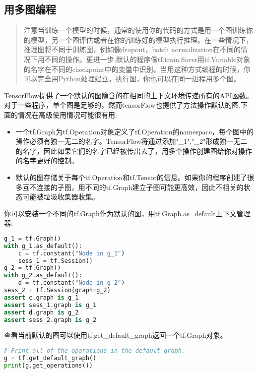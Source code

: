 \subsection{用多图编程}
\begin{quote}
注意当训练一个模型的时候，通常的使用你的代码的方式是用一个图训练你的模型，另一个图评估或者在你的训练好的模型执行推理。在一些情况下，推理图将不同于训练图，例如像dropout，batch normalization在不同的情况下用不同的操作。更进一步,默认的程序像tf.train.Saver用tf.Variable对象的名字在不同的checkpoint中的变量中识别。当用这种方式编程的时候，你可以完全用Python处理建立，执行图，你也可以在同一进程用多个图。
\end{quote}
TensorFlow提供了一个默认的图隐含的在相同的上下文环境传递所有的API函数。对于一些程序，单个图是足够的，然而tensorFlow也提供了方法操作默认的图,下面的情况在高级使用情况可能很有用:
\begin{itemize}
	\item 一个tf.Graph为tf.Operation对象定义了tf.Operation的namespace，每个图中的操作必须有独一无二的名字。TensorFlow将通过添加"\_1","\_2"形成独一无二的名字，因此如果它们的名字已经被传出去了，用多个操作创建图给你对操作的名字更好的控制。
	\item 默认的图存储关于每个tf.Operation和tf.Tensor的信息。如果你的程序创建了很多互不连接的子图，用不同的tf.Graph建立子图可能更高效，因此不相关的状态可能被垃圾收集器收集。
\end{itemize}
你可以安装一个不同的tf.Graph作为默认的图，用tf.Graph.as\_default上下文管理器:
\begin{lstlisting}[language=Python]
g_1 = tf.Graph()
with g_1.as_default():
    c = tf.constant("Node in g_1")
    sess_1 = tf.Session()
g_2 = tf.Graph()
with g_2.as_default():
    d = tf.constant("Node in g_2")
sess_2 = tf.Session(graph=g_2)
assert c.graph is g_1
assert sess_1.graph is g_1
assert d.graph is g_2
assert sess_2.graph is g_2
\end{lstlisting}
查看当前默认的图可以使用tf.get\_default\_graph返回一个tf.Graph对象。
\begin{lstlisting}[language=Python]
# Print all of the operations in the default graph.
g = tf.get_default_graph()
print(g.get_operations())
\end{lstlisting}
